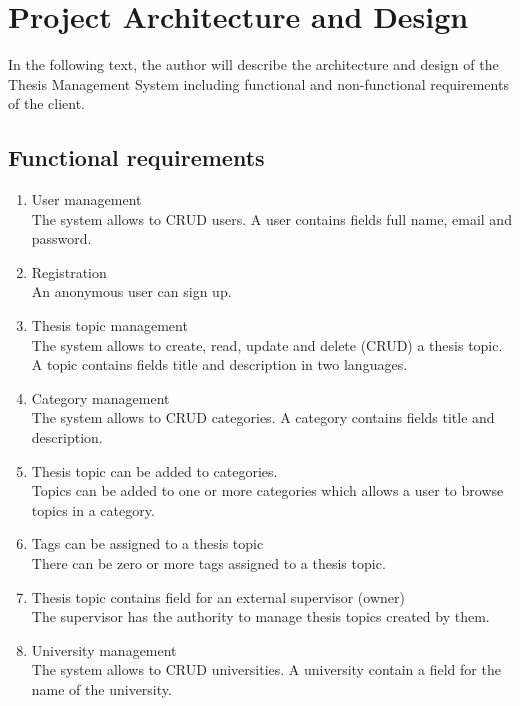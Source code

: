 \chapter{Project Architecture and Design}

In the following text, the author will describe the architecture and design of the Thesis Management System including functional and non-functional requirements of the client.

\section{Functional requirements}

\begin{enumerate}
    \item User management\\
    The system allows to CRUD users. A user contains fields full name, email and password.

    \item Registration\\
    An anonymous user can sign up.

    \item Thesis topic management\\
    The system allows to create, read, update and delete (CRUD) a thesis topic. A topic contains fields title and description in two languages.

    \item Category management\\
    The system allows to CRUD categories. A category contains fields title and description.

    \item Thesis topic can be added to categories.\\
    Topics can be added to one or more categories which allows a user to browse topics in a category.

    \item Tags can be assigned to a thesis topic\\
    There can be zero or more tags assigned to a thesis topic.

    \item Thesis topic contains field for an external supervisor (owner)\\
    The supervisor has the authority to manage thesis topics created by them.

    \item University management\\
    The system allows to CRUD universities. A university contain a field for the name of the university.


\end{enumerate}
